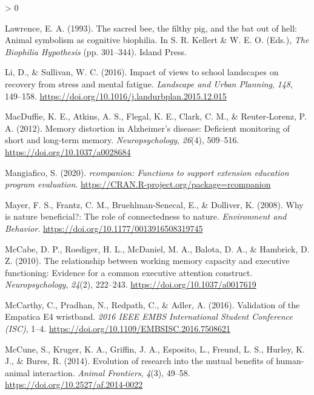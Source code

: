 \documentclass[
  english,
  pub,floatsintext]{apa6}
\newlength{\cslhangindent}
\newenvironment{CSLReferences}[2] %
 {%
  \setlength{\parindent}{0pt}
  \ifodd #1 \everypar{\setlength{\hangindent}{\cslhangindent}}\ignorespaces\fi
  \ifnum #2 > 0
  \setlength{\parskip}{#2\baselineskip}
  \fi
 }%
 {}
\begin{document}
\begin{CSLReferences}{1}{0}
\leavevmode\hypertarget{ref-Lawrence.1993}{}%
Lawrence, E. A. (1993). The sacred bee, the filthy pig, and the bat out of hell: {Animal} symbolism as cognitive biophilia. In S. R. Kellert \& W. E. O. (Eds.), \emph{The Biophilia Hypothesis} (pp. 301--344). {Island Press}.

\leavevmode\hypertarget{ref-Li.Sullivan.2016}{}%
Li, D., \& Sullivan, W. C. (2016). Impact of views to school landscapes on recovery from stress and mental fatigue. \emph{Landscape and Urban Planning}, \emph{148}, 149--158. \url{https://doi.org/10.1016/j.landurbplan.2015.12.015}

\leavevmode\hypertarget{ref-MacDuffie.etal.2012}{}%
MacDuffie, K. E., Atkins, A. S., Flegal, K. E., Clark, C. M., \& Reuter-Lorenz, P. A. (2012). Memory distortion in {Alzheimer}'s disease: {Deficient} monitoring of short and long-term memory. \emph{Neuropsychology}, \emph{26}(4), 509--516. \url{https://doi.org/10.1037/a0028684}

\leavevmode\hypertarget{ref-R-rcompanion}{}%
Mangiafico, S. (2020). \emph{{rcompanion}: Functions to support extension education program evaluation}. \url{https://CRAN.R-project.org/package=rcompanion}

\leavevmode\hypertarget{ref-Mayer.etal.2008}{}%
Mayer, F. S., Frantz, C. M., Bruehlman-Senecal, E., \& Dolliver, K. (2008). Why is nature beneficial?: {The} role of connectedness to nature. \emph{Environment and Behavior}. \url{https://doi.org/10.1177/0013916508319745}

\leavevmode\hypertarget{ref-McCabe.etal.2010}{}%
McCabe, D. P., Roediger, H. L., McDaniel, M. A., Balota, D. A., \& Hambrick, D. Z. (2010). The relationship between working memory capacity and executive functioning: Evidence for a common executive attention construct. \emph{Neuropsychology}, \emph{24}(2), 222--243. \url{https://doi.org/10.1037/a0017619}

\leavevmode\hypertarget{ref-McCarthy.etal.2016}{}%
McCarthy, C., Pradhan, N., Redpath, C., \& Adler, A. (2016). Validation of the {Empatica E4} wristband. \emph{2016 {IEEE EMBS International Student Conference} ({ISC})}, 1--4. \url{https://doi.org/10.1109/EMBSISC.2016.7508621}

\leavevmode\hypertarget{ref-McCune.etal.2014}{}%
McCune, S., Kruger, K. A., Griffin, J. A., Esposito, L., Freund, L. S., Hurley, K. J., \& Bures, R. (2014). Evolution of research into the mutual benefits of human-animal interaction. \emph{Animal Frontiers}, \emph{4}(3), 49--58. \url{https://doi.org/10.2527/af.2014-0022}


\end{CSLReferences}
\end{document}

